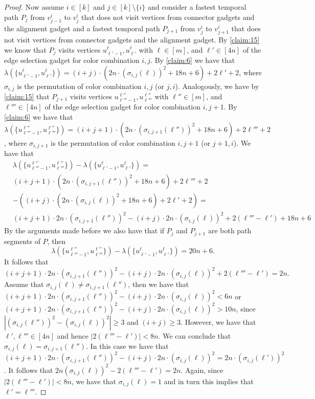 \documentclass[a4paper,UKenglish,cleveref, autoref, thm-restate, anonymous]{lipics-v2021}
\begin{document}
\begin{proof}
Now assume $i\in[k]$ and $j\in[k]\setminus\{i\}$ and consider a fastest temporal path $P_j$ from $v_{j-1}^i$ to $v_j^i$ that does not visit vertices from connector gadgets and the alignment gadget and a fastest temporal path $P_{j+1}$ from $v_{j}^i$ to $v_{j+1}^i$ that does not visit vertices from connector gadgets and the alignment gadget. 
By \cref{claim:15} we know that $P_j$ visits vertices $u^\ell_{\ell'-1},u^\ell_{\ell'}$ with $\ell\in[m]$, and $\ell'\in[4n]$ of the edge selection gadget for color combination $i,j$. 
By \cref{claim:6} we have that $\lambda(\{u^\ell_{\ell'-1},u^\ell_{\ell'}\})=(i+j)\cdot (2n\cdot (\sigma_{i,j}(\ell))^2 +18n+6)+2\ell'+2$, where $\sigma_{i,j}$ is the permutation of color combination $i,j$ (or $j,i$).
Analogously, we have by \cref{claim:15} that $P_{j+1}$ visits vertices $u^{\ell''}_{\ell'''-1},u^{\ell''}_{\ell'''}$ with $\ell''\in[m]$, and $\ell'''\in[4n]$ of the edge selection gadget for color combination $i,j+1$. 
By \cref{claim:6} we have that $\lambda(\{u^{\ell''}_{\ell'''-1},u^{\ell''}_{\ell'''}\})=(i+j+1)\cdot (2n\cdot (\sigma_{i,j+1}(\ell''))^2 +18n+6)+2\ell'''+2$, where $\sigma_{i,j+1}$ is the permutation of color combination $i,j+1$ (or $j+1,i$). We have that 
\begin{align*}
& \lambda(\{u^{\ell''}_{\ell'''-1},u^{\ell''}_{\ell'''}\})-\lambda(\{u^\ell_{\ell'-1},u^\ell_{\ell'}\}) = \\
& (i+j+1)\cdot (2n\cdot (\sigma_{i,j+1}(\ell''))^2 +18n+6)+2\ell'''+2\\
& -((i+j)\cdot (2n\cdot (\sigma_{i,j}(\ell))^2 +18n+6)+2\ell'+2) = \\
& (i+j+1)\cdot 2n\cdot (\sigma_{i,j+1}(\ell''))^2 - (i+j)\cdot 2n\cdot (\sigma_{i,j}(\ell))^2 + 2(\ell'''-\ell') + 18n + 6
\end{align*}
By the arguments made before we also have that if $P_j$ and $P_{j+1}$ are both path segments of $P$, then 
\[
\lambda(\{u^{\ell''}_{\ell'''-1},u^{\ell''}_{\ell'''}\})-\lambda(\{u^\ell_{\ell'-1},u^\ell_{\ell'}\}) = 20n+6.
\]
It follows that 
\[
(i+j+1)\cdot 2n\cdot (\sigma_{i,j+1}(\ell''))^2 - (i+j)\cdot 2n\cdot (\sigma_{i,j}(\ell))^2 + 2(\ell'''-\ell') = 2n.
\]
Assume that $\sigma_{i,j}(\ell)\neq \sigma_{i,j+1}(\ell'')$, then we have that $(i+j+1)\cdot 2n\cdot (\sigma_{i,j+1}(\ell''))^2 - (i+j)\cdot 2n\cdot (\sigma_{i,j}(\ell))^2<6n$ or $(i+j+1)\cdot 2n\cdot (\sigma_{i,j+1}(\ell''))^2 - (i+j)\cdot 2n\cdot (\sigma_{i,j}(\ell))^2>10n$, since $|(\sigma_{i,j}(\ell''))^2-(\sigma_{i,j}(\ell))^2|\ge 3$ and $(i+j)\ge 3$. However, we have that $\ell',\ell'''\in[4n]$ and hence $|2(\ell'''-\ell')|< 8n$. We can conclude that $\sigma_{i,j}(\ell)= \sigma_{i,j+1}(\ell'')$.
In this case we have that $(i+j+1)\cdot 2n\cdot (\sigma_{i,j+1}(\ell''))^2 - (i+j)\cdot 2n\cdot (\sigma_{i,j}(\ell))^2= 2n\cdot (\sigma_{i,j}(\ell'))^2$.
It follows that $2n(\sigma_{i,j}(\ell))^2-2(\ell'''-\ell')=2n$. Again, since $|2(\ell'''-\ell')|< 8n$, we have that $\sigma_{i,j}(\ell)=1$ and in turn this implies that $\ell'=\ell'''$.


\end{proof}
\end{document}
